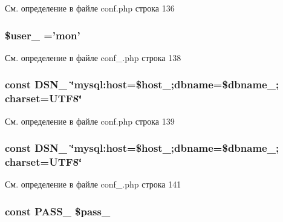 См. определение в файле conf.\-php строка 136

\hypertarget{group___d_b__3_ga5f8fd50656344478702668d5de68e802}{
\subsubsection[{\$user\-\_\-3}]{\setlength{\rightskip}{0pt plus 5cm}\$user\-\_ ='mon'}}\label{group___d_b__3_ga5f8fd50656344478702668d5de68e802}


См. определение в файле conf\-\_\-.\-php строка 138

\hypertarget{group___d_b__3_ga84e111746d69b14479dbf3f99b4e21ad}{
\subsubsection[{D\-S\-N\-\_\-3}]{\setlength{\rightskip}{0pt plus 5cm}const D\-S\-N\-\_ \char`\"{}mysql\-:host=\$host\-\_;dbname=\$dbname\-\_; charset=U\-T\-F8\char`\"{}}}\label{group___d_b__3_ga84e111746d69b14479dbf3f99b4e21ad}


См. определение в файле conf.\-php строка 139

\hypertarget{group___d_b__3_ga84e111746d69b14479dbf3f99b4e21ad}{
\subsubsection[{D\-S\-N\-\_\-3}]{\setlength{\rightskip}{0pt plus 5cm}const D\-S\-N\-\_ \char`\"{}mysql\-:host=\$host\-\_;dbname=\$dbname\-\_; charset=U\-T\-F8\char`\"{}}}\label{group___d_b__3_ga84e111746d69b14479dbf3f99b4e21ad}


См. определение в файле conf\-\_\-.\-php строка 141

\hypertarget{group___d_b__3_gad7bf3ef090d7da2ae80f4a5f3ab4e67c}{
\subsubsection[{P\-A\-S\-S\-\_\-3}]{\setlength{\rightskip}{0pt plus 5cm}const P\-A\-S\-S\-\_ \$pass\-\_}}\label{group___d_b__3_gad7bf3ef090d7da2ae80f4a5f3ab4e67c}


